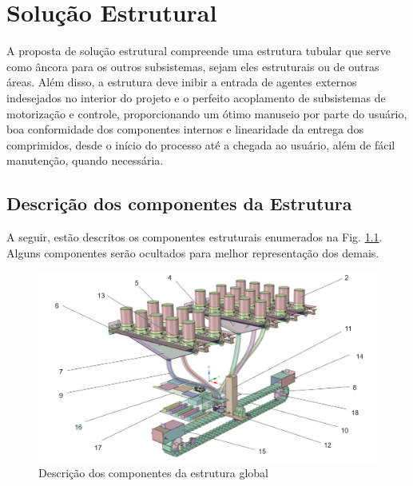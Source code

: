 \chapter[Solução Estrutural]{Solução Estrutural}

A proposta de solução estrutural compreende uma estrutura tubular que serve como âncora para os outros subsistemas, sejam eles estruturais ou de outras áreas. Além disso, a estrutura deve inibir a entrada de agentes externos indesejados no interior do projeto e o perfeito acoplamento de subsistemas de motorização e controle, proporcionando um ótimo manuseio por parte do usuário, boa conformidade dos componentes internos e linearidade da entrega dos comprimidos, desde o início do processo até a chegada ao usuário, além de fácil manutenção, quando necessária.


\section{Descrição dos componentes da Estrutura}

A seguir, estão descritos os componentes estruturais enumerados na Fig. \ref{fig:Descrição_Global}. Alguns componentes serão ocultados para melhor representação dos demais.

\begin{figure}[ht]
        \centering
        \includegraphics[width=1\textwidth]{figuras/estrutura/Design/descricao_estrutura.png}
        \caption{Descrição dos componentes da estrutura global}
        \label{fig:Descrição_Global}
    \end{figure}

